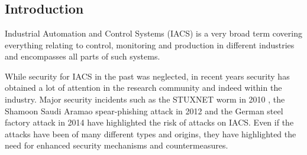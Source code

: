 \chapter[\paperIVtitle]{\texorpdfstring{%
                \paperIVtitle}{%
                \paperIVtitle}}

\label{ch:digital-twin}





\section{Introduction}
\label{sec:digital-twin:introduction}

Industrial Automation and Control Systems (IACS) is a very broad term covering everything relating to control, monitoring and production in different industries and encompasses all parts of such systems.

While security for IACS in the past was neglected, in recent years security has obtained a lot of attention in the research community and indeed within the industry. Major security incidents such as the STUXNET worm in 2010 \cite{Falliere2011}, the Shamoon Saudi Aramao spear-phishing attack in 2012 \cite{Leyden2012} and the German steel factory attack in 2014 \cite{Roberts2014} have highlighted the risk of attacks on IACS.  Even if the attacks have been of many different types and origins, they have highlighted the need for enhanced security mechanisms and countermeasures. 


